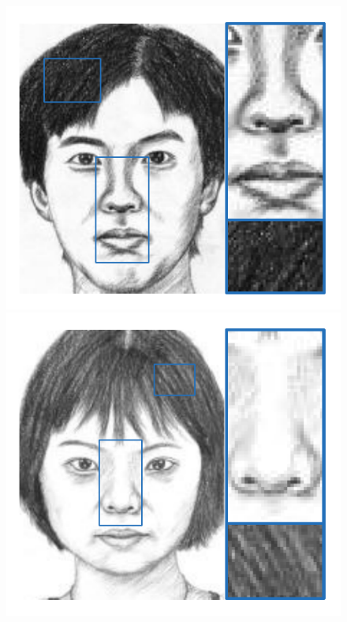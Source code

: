 \documentclass[10pt,twocolumn,letterpaper]{article}
\begin{document}
\begin{figure}[htbp]
\begin{minipage}[t]{0.138\linewidth}
\includegraphics[width=0.99\linewidth]{img/example1_gro.pdf}
\includegraphics[width=0.99\linewidth]{img/example2_gro.pdf}

\end{minipage}
\end{figure}
\end{document}
